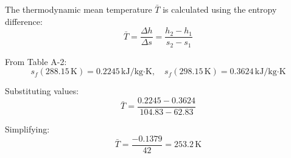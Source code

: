 The thermodynamic mean temperature \( \bar{T} \) is calculated using the entropy difference:  
\[
\bar{T} = \frac{\Delta h}{\Delta s} = \frac{h_2 - h_1}{s_2 - s_1}
\]  

From Table A-2:  
\[
s_f(288.15 \, \text{K}) = 0.2245 \, \text{kJ/kg·K}, \quad s_f(298.15 \, \text{K}) = 0.3624 \, \text{kJ/kg·K}
\]  

Substituting values:  
\[
\bar{T} = \frac{0.2245 - 0.3624}{104.83 - 62.83}
\]  

Simplifying:  
\[
\bar{T} = \frac{-0.1379}{42} = 253.2 \, \text{K}
\]